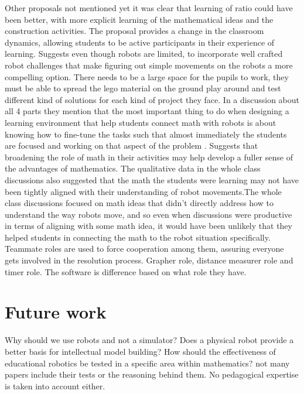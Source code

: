 \bigskip\noindent
Other proposals not mentioned yet
\cite{norton2004using}it was clear that learning of ratio could have been better, with more explicit learning of the mathematical ideas and the construction activities. 
\cite{mitnik2009collaborative} The proposal provides a change in the classroom dynamics, allowing students to be active participants in their experience of learning. 
\cite{silk2011resources} Suggests even though robots are limited, to incorporate well crafted robot challenges that make figuring out simple movements on the robots a more compelling option. 
\cite{lindh2007does} There needs to be a large space for the pupils to work, they must be able to spread the lego material on the ground play around and test different kind of solutions for each kind of project they face.
\cite{silk2011resources} In a discussion about all 4 parts they mention that the most important thing to do when designing a learning environment that help students connect math with robots is about knowing how to fine-tune the tasks such that almost immediately the students are focused and working on that aspect of the problem . 
\cite{silk2011resources} Suggests that broadening the role of math in their activities may help develop a fuller sense of the advantages of mathematics. The qualitative data in the whole class discussions also suggested that the math the students were learning may not have been tightly aligned with their understanding of robot movements.The whole class discussions focused on math ideas that didn't directly address how to understand the way robots move, and so even when discussions were productive in terms of aligning with some math idea, it would have been unlikely that they helped students in connecting the math to the robot situation specifically. 
\cite{mitnik2009collaborative} Teammate roles are used to force cooperation among them, assuring everyone gets involved in the resolution process. Grapher role, distance measurer role and timer role. The software is difference based on what role they have. 

\section{Future work}
Why should we use robots and not a simulator?
Does a physical robot provide a better basis for intellectual model building?
How should the effectiveness of educational robotics be tested in a specific area within mathematics? not many papers include their tests or the reasoning behind them. No pedagogical expertise is taken into account either.  

